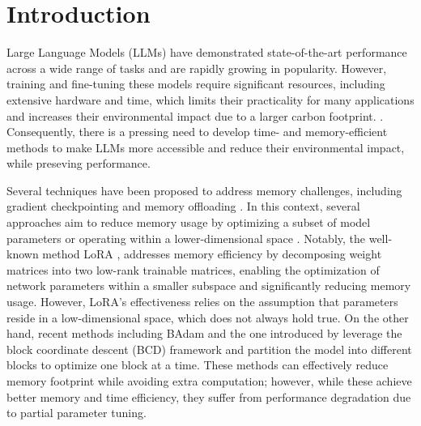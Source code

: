 

\section{Introduction}
Large Language Models (LLMs) have demonstrated state-of-the-art performance across a wide range of tasks and are rapidly growing in popularity. However, training and fine-tuning these models require significant resources, including extensive hardware and time, which limits their practicality for many applications and increases their environmental impact due to a larger carbon footprint. \citep{zhao2024galorememoryefficientllmtraining, jaiswal2024galorewelorelowrankweights, muhamed2024grasscomputeefficientlowmemory, miles2024veloramemoryefficienttraining, modoranu2024microadamaccurateadaptiveoptimization, hao2024floralowrankadapterssecretly, li2024owloreoutlierweighedlayerwisesampled}. 
Consequently, there is a pressing need to develop time- and memory-efficient methods to make LLMs more accessible and reduce their environmental impact, while preseving performance. 

Several techniques have been proposed to address memory challenges, including gradient checkpointing \citep{chen2016trainingdeepnetssublinear} and memory offloading \citep{rajbhandari2020zeromemoryoptimizationstraining}. In this context, several approaches aim to reduce memory usage by optimizing a subset of model parameters or operating within a lower-dimensional space \citep{dettmers2024qlora, yaras2024compressible, lialin2023relorahighranktraininglowrank, renduchintala-etal-2024-tied, xia2024chainloraefficientfinetuning, miles2024veloramemoryefficienttraining, hu2021lora}. Notably, the well-known method LoRA \citep{hu2021lora}, addresses memory efficiency by decomposing weight matrices into two low-rank trainable matrices, enabling the optimization of network parameters within a smaller subspace and significantly reducing memory usage. However, LoRA's effectiveness relies on the assumption that parameters reside in a low-dimensional space, which does not always hold true. On the other hand, recent methods including BAdam \citep{luo2024badammemoryefficientparameter} and the one introduced by \citet{ramesh2024blockllmmemoryefficientadaptationllms} leverage the block coordinate descent (BCD) framework and partition the model into different blocks to optimize one block at a time. These methods can effectively reduce memory footprint while avoiding extra computation; however, while these achieve better memory and time efficiency, they suffer from performance degradation due to partial parameter tuning. 

